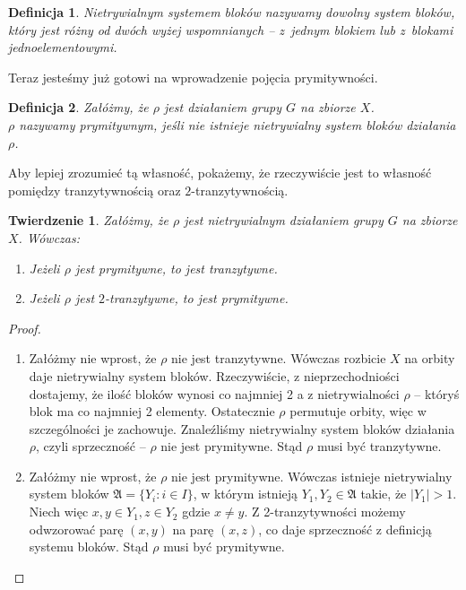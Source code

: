 \documentclass[licencjacka]{pracamgr}
\newtheorem{deff}{Definicja}[section]
\newtheorem{thh}{Twierdzenie}[section]
\begin{document}
\begin{deff}
	\emph{Nietrywialnym systemem bloków} nazywamy dowolny system bloków, 
	który jest różny od dwóch wyżej wspomnianych -- z~jednym blokiem lub z~blokami jednoelementowymi.
\end{deff}

Teraz jesteśmy już gotowi na wprowadzenie pojęcia prymitywności.

\begin{deff}
	Załóżmy, że $\rho$ jest działaniem grupy $G$ na zbiorze $X$. \\
	\emph{$\rho$ nazywamy prymitywnym}, jeśli nie istnieje nietrywialny system bloków działania $\rho$.
\end{deff}

Aby lepiej zrozumieć tą własność, pokażemy, że rzeczywiście jest to własność pomiędzy tranzytywnością oraz $2$-tranzytywnością.

\begin{thh}
	Załóżmy, że $\rho$ jest nietrywialnym działaniem grupy $G$ na zbiorze $X$. Wówczas:
	\begin{enumerate}[label=\alph*)]
	 \item Jeżeli $\rho$ jest prymitywne, to jest tranzytywne.
	 \item Jeżeli $\rho$ jest $2$-tranzytywne, to jest prymitywne.
	\end{enumerate}
\end{thh}

\begin{proof}%
	\begin{enumerate}[label=Ad \alph*)] 
	 \item 	Załóżmy nie wprost, że $\rho$ nie jest tranzytywne. 
					Wówczas rozbicie $X$ na orbity daje nietrywialny system bloków.
					Rzeczywiście, z nieprzechodniości dostajemy, że ilość bloków wynosi co najmniej 2 a
					z nietrywialności $\rho$ -- któryś blok ma co najmniej 2 elementy.
					Ostatecznie $\rho$ permutuje orbity, więc w szczególności je zachowuje.
					Znaleźliśmy nietrywialny system bloków działania $\rho$, czyli sprzeczność -- $\rho$ nie jest prymitywne.
					Stąd $\rho$ musi być tranzytywne.
	 \item 	Załóżmy nie wprost, że $\rho$ nie jest prymitywne.
					Wówczas istnieje nietrywialny system bloków $\mathfrak{A} = \{Y_i \colon i \in I \}$, 
					w którym istnieją $Y_1, Y_2 \in \mathfrak{A}$ takie, że $|Y_1| > 1$.
					Niech więc $x,y \in Y_1, z \in Y_2$ gdzie $x \ne y$.
					Z 2-tranzytywności możemy odwzorować parę $(x, y)$ na parę $(x, z)$, co daje sprzeczność z definicją systemu bloków.
					Stąd $\rho$ musi być prymitywne.
	\end{enumerate}
\end{proof}
\end{document}

